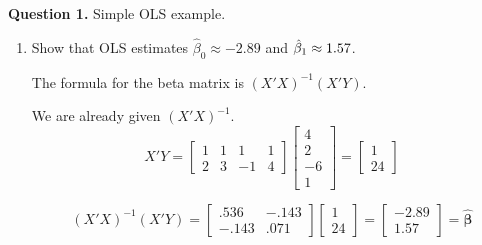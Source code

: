 \documentclass[12pt]{article}
\begin{document}
\vspace{4mm} 
\textbf{Question 1.} \hspace{3mm} Simple OLS example.
\vspace{4mm} 
\renewcommand{\theenumi}{\alph{enumi}}
\begin{enumerate}
  \item Show that OLS estimates $\hat{\beta}_0 \approx -2.89$ and $\hb1 \approx 1.57$.
  
The formula for the beta matrix is $(X'X)^{-1}(X'Y)$.

We are already given $(X'X)^{-1}$.\\


\[
X'Y=\left[
\begin{array}{cccc}
1&1&1 & 1\\ 2 & 3 & -1 & 4 \end{array} \right]  \left[ \begin{array}{r} 4 \\ 2 \\ -6 \\1 \end{array} \right] = \left[ \begin{array}{c} 1 \\24 \end{array} \right] 
\]

\[
(X'X)^{-1}(X'Y) = \left[\begin{array}{cc} .536 & -.143 \\ -.143 & .071 \end{array} \right] \left[ \begin{array}{c} 1 \\24 \end{array} \right] =  \left[ \begin{array}{r} -2.89 \\ 1.57 \end{array} \right] = \mathbf{\hat{\beta} }
\]

%
%
\vspace{5mm}


\end{enumerate}
\end{document}
